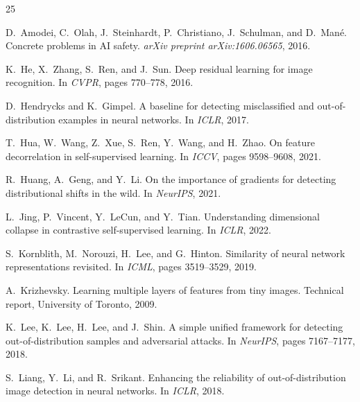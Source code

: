 \documentclass{article}
\begin{document}
\begin{thebibliography}{25}

D.~Amodei, C.~Olah, J.~Steinhardt, P.~Christiano, J.~Schulman, and D.~Man\'{e}.
\newblock Concrete problems in AI safety.
\newblock \emph{arXiv preprint arXiv:1606.06565}, 2016.

K.~He, X.~Zhang, S.~Ren, and J.~Sun.
\newblock Deep residual learning for image recognition.
\newblock In \emph{CVPR}, pages 770--778, 2016.

D.~Hendrycks and K.~Gimpel.
\newblock A baseline for detecting misclassified and out-of-distribution examples in neural networks.
\newblock In \emph{ICLR}, 2017.

T.~Hua, W.~Wang, Z.~Xue, S.~Ren, Y.~Wang, and H.~Zhao.
\newblock On feature decorrelation in self-supervised learning.
\newblock In \emph{ICCV}, pages 9598--9608, 2021.

R.~Huang, A.~Geng, and Y.~Li.
\newblock On the importance of gradients for detecting distributional shifts in the wild.
\newblock In \emph{NeurIPS}, 2021.

L.~Jing, P.~Vincent, Y.~LeCun, and Y.~Tian.
\newblock Understanding dimensional collapse in contrastive self-supervised learning.
\newblock In \emph{ICLR}, 2022.

S.~Kornblith, M.~Norouzi, H.~Lee, and G.~Hinton.
\newblock Similarity of neural network representations revisited.
\newblock In \emph{ICML}, pages 3519--3529, 2019.

A.~Krizhevsky.
\newblock Learning multiple layers of features from tiny images.
\newblock Technical report, University of Toronto, 2009.

K.~Lee, K.~Lee, H.~Lee, and J.~Shin.
\newblock A simple unified framework for detecting out-of-distribution samples and adversarial attacks.
\newblock In \emph{NeurIPS}, pages 7167--7177, 2018.

S.~Liang, Y.~Li, and R.~Srikant.
\newblock Enhancing the reliability of out-of-distribution image detection in neural networks.
\newblock In \emph{ICLR}, 2018.


\end{thebibliography}
\end{document}

